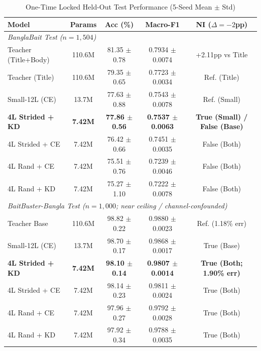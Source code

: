 \documentclass[conference]{IEEEtran}
\begin{document}
\begin{table}[htbp]
\caption{One-Time Locked Held-Out Test Performance (5-Seed Mean $\pm$ Std)}
\label{tab:test}
\begin{center}
\begin{tabular}{lcccc}
\toprule
\textbf{Model} & \textbf{Params} & \textbf{Acc (\%)} & \textbf{Macro-F1} & \textbf{NI ($\Delta=-2$pp)} \\
\midrule
\multicolumn{5}{l}{\textit{BanglaBait Test ($n=1,504$)}} \\
Teacher (Title+Body) & 110.6M & 81.35 $\pm$ 0.78 & 0.7934 $\pm$ 0.0074 & +2.11pp vs Title \\
Teacher (Title) & 110.6M & 79.35 $\pm$ 0.65 & 0.7723 $\pm$ 0.0034 & Ref. (Title) \\
Small-12L (CE) & 13.7M & 77.63 $\pm$ 0.88 & 0.7543 $\pm$ 0.0078 & Ref. (Small) \\
\textbf{4L Strided + KD} & \textbf{7.42M} & \textbf{77.86 $\pm$ 0.56} & \textbf{0.7537 $\pm$ 0.0063} & \textbf{True (Small) / False (Base)} \\
4L Strided + CE & 7.42M & 76.42 $\pm$ 0.66 & 0.7451 $\pm$ 0.0035 & False (Both) \\
4L Rand + CE & 7.42M & 75.51 $\pm$ 0.76 & 0.7239 $\pm$ 0.0046 & False (Both) \\
4L Rand + KD & 7.42M & 75.27 $\pm$ 1.10 & 0.7222 $\pm$ 0.0078 & False (Both) \\
\midrule
\multicolumn{5}{l}{\textit{BaitBuster-Bangla Test ($n=1,000$; near ceiling / channel-confounded)}} \\
Teacher Base & 110.6M & 98.82 $\pm$ 0.22 & 0.9880 $\pm$ 0.0023 & Ref. (1.18\% err) \\
Small-12L (CE) & 13.7M & 98.70 $\pm$ 0.17 & 0.9868 $\pm$ 0.0017 & True (Base) \\
\textbf{4L Strided + KD} & \textbf{7.42M} & \textbf{98.10 $\pm$ 0.14} & \textbf{0.9807 $\pm$ 0.0014} & \textbf{True (Both; 1.90\% err)} \\
4L Strided + CE & 7.42M & 98.14 $\pm$ 0.23 & 0.9811 $\pm$ 0.0024 & True (Both) \\
4L Rand + CE & 7.42M & 97.96 $\pm$ 0.27 & 0.9792 $\pm$ 0.0028 & True (Both) \\
4L Rand + KD & 7.42M & 97.92 $\pm$ 0.34 & 0.9788 $\pm$ 0.0035 & True (Both) \\
\bottomrule
\end{tabular}
\end{center}
\end{table}
\end{document}
